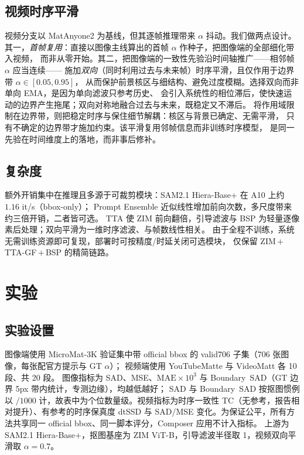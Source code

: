 \documentclass[final]{cvpr}
\begin{document}
\subsection{视频时序平滑}
\label{sec:video}
视频分支以 MatAnyone2 为基线，但其逐帧推理带来 $\alpha$ 抖动。我们做两点设计。
其一，\emph{首帧复用}：直接以图像主线算出的首帧 $\alpha$ 作种子，把图像端的全部细化带入视频，
而非从零开始。其二，把图像端的一致性先验沿时间轴推广——相邻帧 $\alpha$ 应当连续——
施加\emph{双向}（同时利用过去与未来帧）时序平滑，且仅作用于边界带 $\alpha\in[0.05,0.95]$，
从而保护前景核区与细结构、避免过度模糊。选择双向而非单向 EMA，是因为单向滤波只参考历史、
会引入系统性的相位滞后，使快速运动的边界产生拖尾；双向对称地融合过去与未来，既稳定又不滞后。
将作用域限制在边界带，则把稳定时序与保住细节解耦：核区与背景已确定、无需平滑，
只有不确定的边界带才施加约束。该平滑复用邻帧信息而非训练时序模型，
是同一先验在时间维度上的落地，而非事后修补。

\subsection{复杂度}
\label{sec:complexity}
额外开销集中在推理且多源于可裁剪模块：SAM2.1 Hiera-Base+ 在 A10 上约 $1.16$ it/s（bbox-only）；
Prompt Ensemble 近似线性增加前向次数，多尺度带来约三倍开销，二者皆可选。
TTA 使 ZIM 前向翻倍，引导滤波与 BSP 为轻量逐像素后处理；双向平滑为一维时序滤波、与帧数线性相关。
由于全程不训练，系统无需训练资源即可复现，部署时可按精度/时延关闭可选模块，
仅保留 ZIM\,$+$\,TTA-GF\,$+$\,BSP 的精简链路。

\section{实验}
\label{sec:exp}

\subsection{实验设置}
\label{sec:setup}
图像端使用 MicroMat-3K 验证集中带 official bbox 的 valid706 子集（706 张图像，每张配官方提示与 GT $\alpha$）；
视频端使用 YouTubeMatte 与 VideoMatt 各 10 段、共 20 段。
图像指标为 SAD、MSE、$\mathrm{MAE}\times10^3$ 与 Boundary~SAD（GT 边界 5px 带内统计，专测边缘），均越低越好；
SAD 与 Boundary~SAD 按抠图惯例以 $/1000$ 计，故表中为个位数量级。视频指标为时序一致性 TC（无参考，报告相对提升）、有参考的时序保真度 dtSSD
与 SAD/MSE 变化。为保证公平，所有方法共享同一 official bbox、同一脚本评分，Composer 应用不计入指标。
上游为 SAM2.1 Hiera-Base+，抠图基座为 ZIM ViT-B，引导滤波半径取 1，视频双向平滑取 $\alpha=0.7$。
\end{document}
